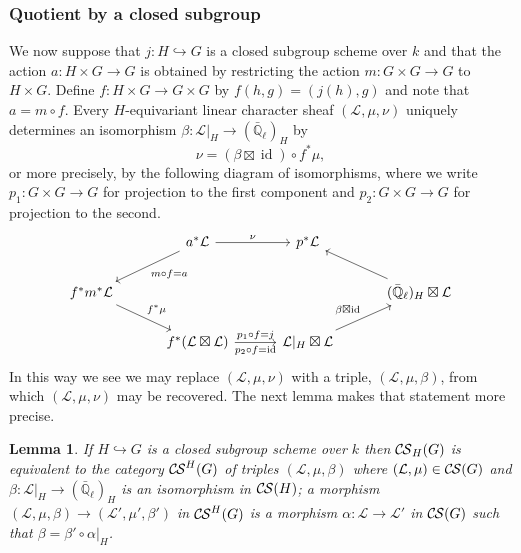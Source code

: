 \documentclass[10pt]{amsart}
\theoremstyle{plain}
\newtheorem{lemma}[theorem]{Lemma}
\theoremstyle{definition}
\newcommand{\EE}{\mathbb{\bar Q}_\ell}
\newcommand{\Fq}{k}
\DeclareMathOperator{\id}{id}
\newcommand{\cs}[1]{{\mathcal{#1}}}
\newcommand{\CS}{{\mathcal{C\hskip-0.8pt S}}}
\begin{document}
\subsubsection{Quotient by a closed subgroup}\label{ssec:closed}

We now suppose that $j : H \hookrightarrow G$ is a closed subgroup scheme over $\Fq$ and that the action $a : H\times G\to G$ is obtained by restricting the action $m : G \times G\to G$ to $H\times G$.
Define $f : H\times G \to G\times G$ by $f(h,g) = (j(h),g)$ and note that $a = m\circ f$.
Every $H$-equivariant linear character sheaf $(\cs{L},\mu, \nu)$ uniquely determines an isomorphism 
$
\beta : \cs{L}\vert_H \to (\EE)_{H}
$
by 
\begin{equation}\label{betanu}
\nu = (\beta \boxtimes \id) \circ  f^*\mu,
\end{equation}
or more precisely, by the following diagram of isomorphisms, where we write $p_1: G\times G\to G$ for projection to the first component and $p_2 : G\times G \to G$ for projection to the second.
\[
\begin{tikzcd}[column sep=30]
\ & a^*\cs{L} \arrow{dl}{m\circ f = a} \arrow{r}{\nu} & p^*\cs{L} & \\
f^* m^*\cs{L} \arrow{dr}{f^*\mu} &&& (\EE)_{H} \boxtimes \cs{L} \arrow{ul} \\ 
& f^*(\cs{L}\boxtimes \cs{L}) \arrow{r}{p_1 \circ f = j}[swap]{p_2\circ f = \id}  & 
\cs{L}\vert_{H} \boxtimes \cs{L} \arrow{ur}{\beta\boxtimes \id} & 
\end{tikzcd}
\]
In this way we see we may replace $(\cs{L},\mu,\nu)$ with a triple, $(\cs{L},\mu,\beta)$, from which $(\cs{L},\mu,\nu)$ may be recovered.
The next lemma makes that statement more precise.


\begin{lemma}\label{lem:beta}
If $H\hookrightarrow G$ is a closed subgroup scheme over $\Fq$ then
$\CS_H(G)$ is equivalent to the category $\CS^H(G)$ of triples $(\cs{L},\mu,\beta)$ where $(\cs{L},\mu)\in \CS(G)$ and $\beta : \cs{L}\vert_H \to (\EE)_H$ is an isomorphism in $\CS(H)$; a morphism $(\cs{L},\mu,\beta) \to (\cs{L}',\mu',\beta')$ in $\CS^H(G)$ is a morphism $\alpha: \cs{L} \to \cs{L}'$ in $\CS(G)$ such that $\beta = \beta' \circ \alpha\vert_{H}$.
\end{lemma}
\end{document}

